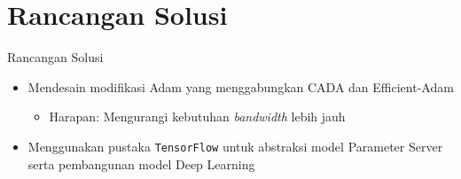\documentclass[aspectratio=169]{beamer}
\begin{document}
\section{Rancangan Solusi}
\begin{frame}{Rancangan Solusi}
  \begin{itemize}
  \item Mendesain modifikasi Adam yang menggabungkan CADA dan Efficient-Adam
          \begin{itemize}
            \item Harapan: Mengurangi kebutuhan \textit{bandwidth} lebih jauh
          \end{itemize}
    \item Menggunakan pustaka \texttt{TensorFlow} untuk abstraksi model Parameter Server serta pembangunan model Deep Learning
  \end{itemize}
\end{frame}
\end{document}
